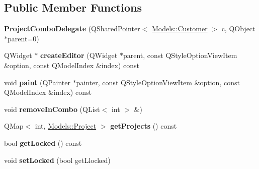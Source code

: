 \subsection*{Public Member Functions}
\begin{DoxyCompactItemize}
\item 
\hypertarget{classGui_1_1Widgets_1_1Delegates_1_1ProjectComboDelegate_a5fda87c3db87a0928717810a0ac2812f}{{\bfseries Project\-Combo\-Delegate} (Q\-Shared\-Pointer$<$ \hyperlink{classModels_1_1Customer}{Models\-::\-Customer} $>$ c, Q\-Object $\ast$parent=0)}\label{classGui_1_1Widgets_1_1Delegates_1_1ProjectComboDelegate_a5fda87c3db87a0928717810a0ac2812f}

\item 
\hypertarget{classGui_1_1Widgets_1_1Delegates_1_1ProjectComboDelegate_adbfc28a3e6de34dc63d7290ae5b5c053}{Q\-Widget $\ast$ {\bfseries create\-Editor} (Q\-Widget $\ast$parent, const Q\-Style\-Option\-View\-Item \&option, const Q\-Model\-Index \&index) const }\label{classGui_1_1Widgets_1_1Delegates_1_1ProjectComboDelegate_adbfc28a3e6de34dc63d7290ae5b5c053}

\item 
\hypertarget{classGui_1_1Widgets_1_1Delegates_1_1ProjectComboDelegate_a20cbc84d26b83083fdf7efecae3407cf}{void {\bfseries paint} (Q\-Painter $\ast$painter, const Q\-Style\-Option\-View\-Item \&option, const Q\-Model\-Index \&index) const }\label{classGui_1_1Widgets_1_1Delegates_1_1ProjectComboDelegate_a20cbc84d26b83083fdf7efecae3407cf}

\item 
\hypertarget{classGui_1_1Widgets_1_1Delegates_1_1ProjectComboDelegate_a7e14627b3942a96f190e31a4e67edc95}{void {\bfseries remove\-In\-Combo} (Q\-List$<$ int $>$ \&)}\label{classGui_1_1Widgets_1_1Delegates_1_1ProjectComboDelegate_a7e14627b3942a96f190e31a4e67edc95}

\item 
\hypertarget{classGui_1_1Widgets_1_1Delegates_1_1ProjectComboDelegate_a63d0ef3a5179d72ab577f359c8f7a6fa}{Q\-Map$<$ int, \hyperlink{classModels_1_1Project}{Models\-::\-Project} $>$ {\bfseries get\-Projects} () const }\label{classGui_1_1Widgets_1_1Delegates_1_1ProjectComboDelegate_a63d0ef3a5179d72ab577f359c8f7a6fa}

\item 
\hypertarget{classGui_1_1Widgets_1_1Delegates_1_1ProjectComboDelegate_ad07bf1e09c752159161a3f585c61b4d7}{bool {\bfseries get\-Locked} () const }\label{classGui_1_1Widgets_1_1Delegates_1_1ProjectComboDelegate_ad07bf1e09c752159161a3f585c61b4d7}

\item 
\hypertarget{classGui_1_1Widgets_1_1Delegates_1_1ProjectComboDelegate_ac93369dde11856d4097851f7f1158f48}{void {\bfseries set\-Locked} (bool get\-Llocked)}\label{classGui_1_1Widgets_1_1Delegates_1_1ProjectComboDelegate_ac93369dde11856d4097851f7f1158f48}

\end{DoxyCompactItemize}


